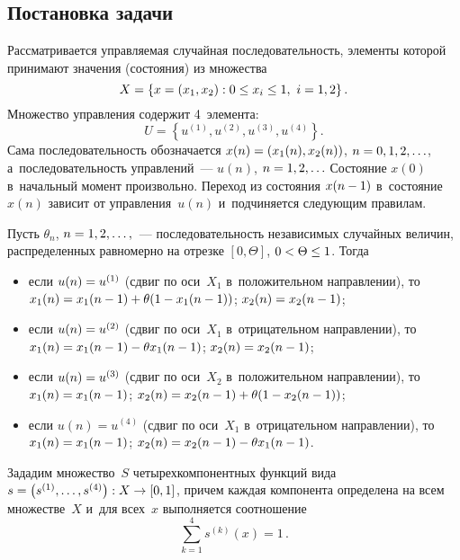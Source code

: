 \begin{multicols}{2}
  \section{Постановка задачи}
  
  Рассматривается управ\-ля\-емая случайная по\-сле\-до\-ва\-тель\-ность, элементы 
которой принимают значения (со\-сто\-яния) из множества 
$$
X= \left\{x= 
(x_1, x_2): 0\hm\leq x_i\hm\leq 1,\ i\hm=1,2\right\}.
$$
 Множество управ\-ле\-ния 
содержит 4~элемента:
$$
U= \left\{ u^{(1)}, u^{(2)}, u^{(3)}, 
u^{(4)}\right\}.
$$
 Сама по\-сле\-до\-ва\-тель\-ность обозначается $x(n)\hm= \left( 
x_1(n), x_2(n)\right)$, $n\hm=0,1,2,\ldots$, а~по\-сле\-до\-ва\-тель\-ность 
управ\-ле\-ний~--- $u(n)$, $n\hm=1,2,\ldots$ Со\-сто\-яние $x(0)$ в~начальный 
момент произвольно. Переход из со\-сто\-яния $x(n\hm-1)$ в~со\-сто\-яние~$x(n)$ 
зависит от управ\-ле\-ния~$u(n)$ и~подчиняется сле\-ду\-ющим правилам. 
  
  Пусть $\theta_n$, $n\hm=1,2,\ldots,$~--- по\-сле\-до\-ва\-тель\-ность независимых 
случайных величин, распределенных равномерно на отрезке $[0,\Theta]$, 
$0\hm< \Theta\leq 1$. Тогда
  \begin{itemize}
  \item если $u(n)\hm=u^{(1)}$ (сдвиг по оси~$X_1$ в~положительном 
на\-прав\-ле\-нии), то $x_1(n)\hm=x_1(n\hm-1)\hm+\theta(1\hm- x_1(n-1))$; 
$x_2(n)\hm= x_2(n\hm-1)$;
  
  \item
  если $u(n)\hm= u^{(2)}$ (сдвиг по оси~$X_1$ в~отрицательном 
на\-прав\-ле\-нии), то $x_1(n)\hm= x_1(n\hm-1) \hm- \theta x_1(n\hm-1)$; 
$x_2(n)\hm= x_2(n\hm-1)$;
  
  \item
  если $u(n)\hm= u^{(3)}$ (сдвиг по оси~$X_2$ в~положительном 
на\-прав\-ле\-нии), то $x_1(n) \hm= x_1(n\hm-1)$; $x_2(n)\hm= x_2(n\hm-1) 
\hm+\theta (1\hm-x_2(n\hm-1))$;
  
  \item
  если $u(n)=u^{(4)}$ (сдвиг по оси~$X_1$ в~отрицательном на\-прав\-ле\-нии), 
то $x_1(n)\hm= x_1(n\hm-1)$; $x_2(n)\hm= x_2(n\hm-1)\hm- \theta x_1(n\hm-
1)$. 
  \end{itemize}
  
  Зададим множество~$S$ четырехкомпонентных функций вида $s\hm= \left( 
s^{(1)}, \ldots , s^{(4)}\right): X\hm\to [0,1]$, причем каждая компонента 
определена на всем множестве~$X$ и~для всех~$x$ выполняется 
соотношение
  \begin{equation}
  \sum\limits^4_{k=1} s^{(k)}(x)=1\,.
  \label{e1-kraz}
  \end{equation}
  

\end{multicols}
